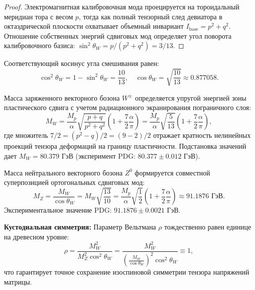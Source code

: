 \documentclass[12pt,a4paper]{article}
\theoremstyle{definition}
\theoremstyle{remark}
\begin{document}
\begin{proof}
	Электромагнитная калибровочная мода проецируется на тороидальный меридиан тора с весом $p$, тогда как полный тензорный след девиатора в октаэдрической плоскости охватывает объемный инвариант $I_{\mathrm{base}} = p^2 + q^2$. Отношение собственных энергий сдвиговых мод определяет угол поворота калибровочного базиса: $\sin^2\theta_W = p / (p^2+q^2) = 3/13$.
\end{proof}

Соответствующий косинус угла смешивания равен:
\begin{equation}
	\cos^2\theta_W = 1 - \sin^2\theta_W = \frac{10}{13}, \quad \cos\theta_W = \sqrt{\frac{10}{13}} \approx 0.877058.
	\label{eq:cos_weinberg}
\end{equation}

Масса заряженного векторного бозона $W^\pm$ определяется упругой энергией зоны пластического сдвига с учетом радиационного экранирования пограничного слоя:
\begin{equation}
	M_W = \frac{M_p}{\alpha} \sqrt{\frac{p+q}{p^2+q^2}} \left( 1 + \frac{7}{2}\frac{\alpha}{\pi} \right) = \frac{M_p}{\alpha} \sqrt{\frac{5}{13}} \left( 1 + \frac{7}{2}\frac{\alpha}{\pi} \right),
	\label{eq:mw_formula}
\end{equation}
где множитель $7/2 = (p^2 - q) / 2 = (9 - 2) / 2$ отражает кратность нелинейных проекций тензора деформаций на границу пластичности. Подстановка значений дает $M_W = 80.379$ ГэВ (эксперимент PDG: $80.377 \pm 0.012$ ГэВ).

Масса нейтрального векторного бозона $Z^0$ формируется совместной суперпозицией ортогональных сдвиговых мод:
\begin{equation}
	M_Z = \frac{M_W}{\cos\theta_W} = M_W \sqrt{\frac{13}{10}} = \frac{M_p}{\alpha} \sqrt{\frac{1}{2}} \left( 1 + \frac{7}{2}\frac{\alpha}{\pi} \right) \approx 91.1876 \text{ ГэВ}.
	\label{eq:mz_formula}
\end{equation}
Экспериментальное значение PDG: $91.1876 \pm 0.0021$ ГэВ.

\textbf{Кустодиальная симметрия:} Параметр Вельтмана $\rho$ тождественно равен единице на древесном уровне:
\begin{equation}
	\rho = \frac{M_W^2}{M_Z^2 \cos^2\theta_W} = \frac{M_W^2}{\left(\frac{M_W}{\cos\theta_W}\right)^2 \cos^2\theta_W} \equiv 1,
	\label{eq:custodial_rho}
\end{equation}
что гарантирует точное сохранение изоспиновой симметрии тензора напряжений матрицы.
\end{document}
